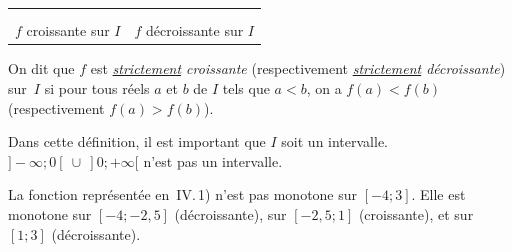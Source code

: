 \begin{center}
\begin{tabular}{c@{\qquad \qquad}c}
\begin{minipage}[c]{0.36\linewidth}
    \end{minipage}  \\
    & \\
    $f$ croissante sur $I$
    &
    $f$ décroissante sur $I$
  \end{tabular}
\end{center}


\begin{rem}
  \begin{minipage}[t]{0.84\linewidth}
  On dit que $f$ est \emph{\underline{strictement} croissante}
  (respectivement \emph{\underline{strictement} décroissante}) sur~$I$
  si pour tous réels $a$ et $b$ de $I$ tels que $a<b$, on a
  $f(a)<f(b)$ (respectivement $f(a)>f(b)$).  \\
  \end{minipage}
\end{rem}

\begin{rem}
  \begin{minipage}[t]{0.8\linewidth}
    Dans cette définition, il est important que $I$ soit un
    intervalle. \\ $]-\infty;0[\ \cup \ ]0;+\infty[$ n'est pas un
    intervalle. \\
  \end{minipage}
\end{rem}

\begin{definition}
\end{definition}

\smallskip

La fonction représentée en \,IV.\,1) n'est pas
monotone sur $[-4;3]$. Elle est monotone sur $[-4;-2,5]$
(décroissante), sur $[-2,5;1]$ (croissante), et sur $[1;3]$ (décroissante).\\

\begin{definition}
\end{definition}

